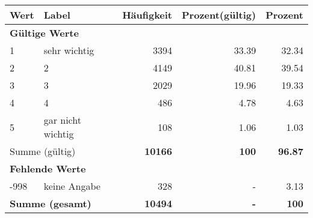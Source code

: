     \begin{longtable}{lXrrr}
     \toprule
     \textbf{Wert} & \textbf{Label} & \textbf{Häufigkeit} & \textbf{Prozent(gültig)} & \textbf{Prozent} \\
     \endhead
     \midrule
     \multicolumn{5}{l}{\textbf{Gültige Werte}}\\

     1 &
     \multicolumn{1}{X}{ sehr wichtig   } &


       \num{3394} &
       \num[round-mode=places,round-precision=2]{33.39} &
         \num[round-mode=places,round-precision=2]{32.34} \\

     2 &
     \multicolumn{1}{X}{ 2   } &


       \num{4149} &
       \num[round-mode=places,round-precision=2]{40.81} &
         \num[round-mode=places,round-precision=2]{39.54} \\

     3 &
     \multicolumn{1}{X}{ 3   } &


       \num{2029} &
       \num[round-mode=places,round-precision=2]{19.96} &
         \num[round-mode=places,round-precision=2]{19.33} \\

     4 &
     \multicolumn{1}{X}{ 4   } &


       \num{486} &
       \num[round-mode=places,round-precision=2]{4.78} &
         \num[round-mode=places,round-precision=2]{4.63} \\

     5 &
     \multicolumn{1}{X}{ gar nicht wichtig   } &


       \num{108} &
       \num[round-mode=places,round-precision=2]{1.06} &
         \num[round-mode=places,round-precision=2]{1.03} \\
     \midrule
     \multicolumn{2}{l}{Summe (gültig)} &
       \textbf{\num{10166}} &
     \textbf{\num{100}} &
       \textbf{\num[round-mode=places,round-precision=2]{96.87}} \\
     \multicolumn{5}{l}{\textbf{Fehlende Werte}}\\
       -998 &
       keine Angabe &
         \num{328} &
        - &
         \num[round-mode=places,round-precision=2]{3.13} \\
     \midrule
     \multicolumn{2}{l}{\textbf{Summe (gesamt)}} &
          \textbf{\num{10494}} &
        \textbf{-} &
        \textbf{\num{100}} \\
     \bottomrule
     \end{longtable}
     
